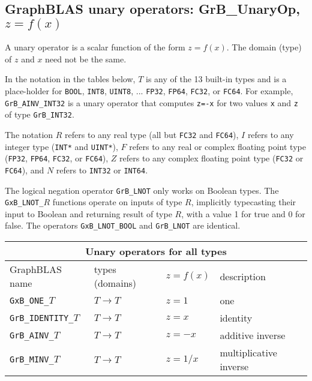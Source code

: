 \documentclass[12pt]{article}
\begin{document}
{\newpage
\subsection{GraphBLAS unary operators: {\sf GrB\_UnaryOp}, $z=f(x)$} %
\label{unaryop}

A unary operator is a scalar function of the form $z=f(x)$.  The domain (type)
of $z$ and $x$ need not be the same.

In the notation in the tables
below, $T$ is any of the 13 built-in types and is a place-holder for
\verb'BOOL', \verb'INT8', \verb'UINT8', ... 
\verb'FP32', \verb'FP64', \verb'FC32', or \verb'FC64'.
For example, \verb'GrB_AINV_INT32' is a unary operator that computes
\verb'z=-x' for two values \verb'x' and \verb'z' of type \verb'GrB_INT32'.

The notation $R$ refers to any real type (all but \verb'FC32' and \verb'FC64'),
$I$ refers to any integer type (\verb'INT*' and \verb'UINT*'),
$F$ refers to any real or complex floating point type
(\verb'FP32', \verb'FP64', \verb'FC32', or \verb'FC64'),
$Z$ refers to any complex floating point type
(\verb'FC32' or \verb'FC64'),
and $N$ refers to \verb'INT32' or \verb'INT64'.

The logical negation operator \verb'GrB_LNOT' only works on Boolean types.  The
\verb'GxB_LNOT_'$R$ functions operate on inputs of type $R$, implicitly
typecasting their input to Boolean and returning result of type $R$, with a
value 1 for true and 0 for false.  The operators \verb'GxB_LNOT_BOOL' and
\verb'GrB_LNOT' are identical.

\vspace{0.2in}
{\footnotesize
\begin{tabular}{|llll|}
\hline
\multicolumn{4}{|c|}{Unary operators for all types} \\
\hline
GraphBLAS name          & types (domains)   & $z=f(x)$      & description \\
\hline
\verb'GxB_ONE_'$T$      & $T \rightarrow T$ & $z = 1$       & one \\
\verb'GrB_IDENTITY_'$T$ & $T \rightarrow T$ & $z = x$       & identity \\
\verb'GrB_AINV_'$T$     & $T \rightarrow T$ & $z = -x$      & additive inverse \\
\verb'GrB_MINV_'$T$     & $T \rightarrow T$ & $z = 1/x$     & multiplicative inverse \\
\hline
\end{tabular}

}}
\end{document}
